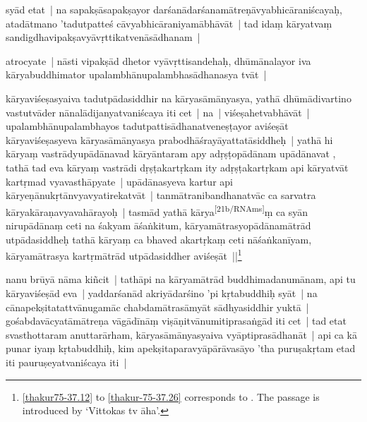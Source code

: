 \documentclass[article,a4paper]{memoir}
\newcommand{\gap}[1]{}
\begin{document}
	  \pstart {}\label{rnā__96541}syā\-d etat | na sapakṣā\-sapakṣayor darśanā\-darśanamā\-treṇā\-vyabhicā\-raniścayaḥ, atadā\-tmano 'tadutpatteś cā\-vyabhicā\-raniyamā\-bhā\-vā\-t | tad idaṃ kā\-ryatvaṃ sandigdhavipakṣavyā\-vṛttikatvenā\-sā\-dhanam |
	\pend
      

	  \pstart atrocyate | nā\-sti vipakṣā\-d dhetor vyā\-vṛttisandehaḥ, dhū\-mā\-nalayor iva kā\-ryabuddhimator upalambhā\-nupalambhasā\-dhanasya tvā\-t |
	\pend
      

	  \pstart kā\-ryaviśeṣasyaiva tadutpā\-dasiddhir na kā\-\gap{}ryasā\-mā\-nyasya, yathā\- dhū\-mā\-divartino vastutvā\-der nā\-nalā\-dijanyatvaniścaya iti cet | na | viśeṣahetvabhā\-vā\-t | upalambhā\-nupalambhayos tadutpattisā\-dhanatveneṣṭayor aviśeṣā\-t kā\-ryaviśeṣasyeva kā\-ryasā\-mā\-nyasya prabodhā\-śrayā\-yattatā\-siddheḥ |\label{rnā__97385} yathā\- hi kā\-ryaṃ vastrā\-dyupā\-dā\-navad  kā\-ryā\-ntaram apy adṛṣṭopā\-dā\-nam upā\-dā\-navat , tathā\- tad eva kā\-ryaṃ vastrā\-di dṛṣṭakartṛkam ity adṛṣṭakartṛkam api kā\-ryatvā\-t kartṛmad vyavasthā\-pyate | upā\-dā\-nasyeva kartur api kā\-ryeṇā\-nukṛtā\-nvyavyatirekatvā\-t | tanmā\-tranibandhanatvā\-c ca sarvatra kā\-ryakā\-raṇavyavahā\-rayoḥ | tasmā\-d yathā\- kā\-rya\leavevmode\textsuperscript{\rmlatinfont\tiny [21b/RNAms]}\label{RNAms_21b}ṃ ca syā\-n nirupā\-dā\-naṃ ceti na śakyam ā\-śaṅkitum, kā\-ryamā\-trasyopā\-dā\-namā\-trā\-d utpā\-dasiddheḥ tathā\- kā\-ryaṃ ca bhaved akartṛkaṃ ceti nā\-śaṅkanī\-yam, kā\-ryamā\-trasya kartṛmā\-trā\-d utpā\-dasiddher aviśeṣā\-t ||\label{thakur-75-37.26}\footnote{\cref{thakur75-37.12} to \cref{thakur-75-37.26} corresponds to . The passage is introduced by ‘Vittokas tv ā\-ha’.}
	\pend
      

	  \pstart nanu brū\-yā\- nā\-ma kiñcit | tathā\-pi na kā\-ryamā\-trā\-d buddhimadanumā\-nam, api tu kā\-ryaviśeṣā\-d eva | yaddarśanā\-d akriyā\-darśino 'pi kṛtabuddhiḥ syā\-t | na cā\-napekṣitatattvā\-nugamā\-c chabdamā\-trasā\-myā\-t sā\-dhyasiddhir yuktā\- | gośabdavā\-cyatā\-mā\-treṇa vā\-gā\-dī\-nā\-ṃ viṣā\-ṇitvā\-numitiprasaṅgā\-d iti cet | tad etat svasthottaram anuttarā\-rham, kā\-ryasā\-mā\-nyasyaiva vyā\-ptiprasā\-dhanā\-t | api ca kā\- punar iyaṃ kṛtabuddhiḥ, kim apekṣitaparavyā\-pā\-rā\-vasā\-yo 'tha puruṣakṛtam etad iti pauruṣeyatvaniścaya iti |
	\pend
      
\end{document}
